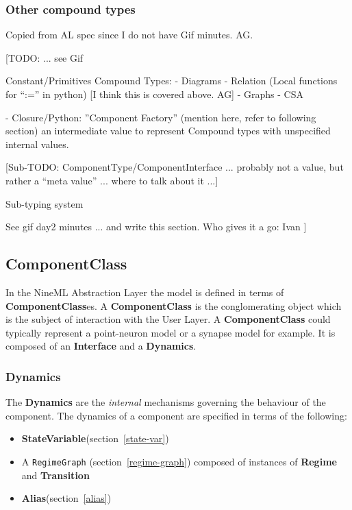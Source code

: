 \documentclass{article}
\newcommand{\ComponentClass}{{\bf{ComponentClass}}\xspace}
\newcommand{\ComponentClasses}{{\bf{ComponentClass}}es\xspace}
\newcommand{\Dynamics}{{\bf{Dynamics}}\xspace}
\newcommand{\Interface}{{\bf{Interface}}\xspace}
\newcommand{\StateVariable}{{\bf{StateVariable}}\xspace}
\newcommand{\Alias}{{\bf{Alias}}\xspace}
\newcommand{\Regime}{{\bf{Regime}}\xspace}
\newcommand{\Transition}{{\bf{Transition}}\xspace}
\begin{document}
\subsubsection{Other compound types}

Copied from AL spec since I do not have Gif minutes. AG.

[TODO: ... see Gif

Constant/Primitives
Compound Types:
- Diagrams
- Relation (Local functions for ``:='' in python) [I think this is covered above. AG]
- Graphs
- CSA

- Closure/Python: ''Component Factory'' (mention here, refer to following section)
  an intermediate value to represent Compound types with
  unspecified internal values.


[Sub-TODO: ComponentType/ComponentInterface ... probably not a
value, but rather a ``meta value'' ... where to talk about it ...]


Sub-typing system

See gif day2 minutes ... and write this section.
Who gives it a go: Ivan
]

\subsection{ComponentClass}

In the NineML Abstraction Layer the model is defined in terms of
\ComponentClasses. A \ComponentClass is the conglomerating
object which is the subject of interaction with the User Layer.  A
\ComponentClass could typically represent a point-neuron model or
a synapse model for example. It is composed of an \Interface and
a \Dynamics.

\subsubsection{Dynamics}

The \Dynamics are the \emph{internal} mechanisms governing the behaviour
of the component. The dynamics of a component are specified in terms of
the following:

\begin{itemize}
\item \StateVariable (section~\ref{state-var})
\item A {\tt RegimeGraph} (section~\ref{regime-graph}) composed of
  instances of \Regime and \Transition
\item \Alias (section~\ref{alias})
\end{itemize}
\end{document}
